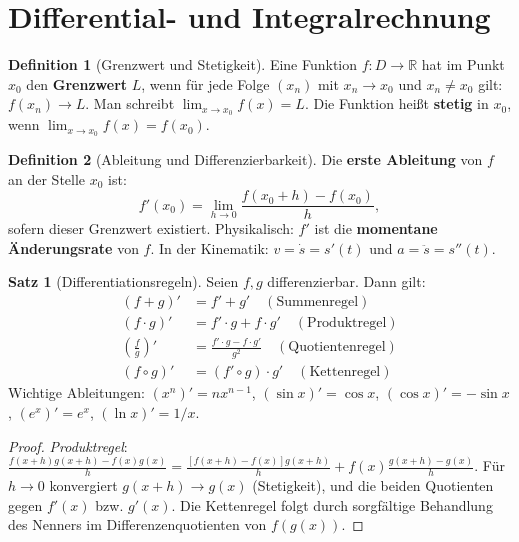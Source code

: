 ﻿\documentclass[a4paper,12pt]{report}
\theoremstyle{definition}
\newtheorem{definition}{Definition}
\newtheorem{satz}{Satz}
\begin{document}
\section{Differential- und Integralrechnung}

\begin{definition}[Grenzwert und Stetigkeit]
Eine Funktion $f: D \to \mathbb{R}$ hat im Punkt $x_0$ den \textbf{Grenzwert} $L$,
wenn f\"ur jede Folge $(x_n)$ mit $x_n \to x_0$ und $x_n \neq x_0$ gilt: $f(x_n) \to L$.
Man schreibt $\lim_{x \to x_0} f(x) = L$.
Die Funktion hei\ss{}t \textbf{stetig} in $x_0$, wenn $\lim_{x\to x_0}f(x) = f(x_0)$.
\end{definition}

\begin{definition}[Ableitung und Differenzierbarkeit]
Die \textbf{erste Ableitung} von $f$ an der Stelle $x_0$ ist:
\[
  f'(x_0) = \lim_{h \to 0} \frac{f(x_0+h) - f(x_0)}{h},
\]
sofern dieser Grenzwert existiert. Physikalisch: $f'$ ist die
\textbf{momentane \"Anderungsrate} von $f$. In der Kinematik:
$v = \dot{s} = s'(t)$ und $a = \ddot{s} = s''(t)$.
\end{definition}

\begin{satz}[Differentiationsregeln]
Seien $f, g$ differenzierbar. Dann gilt:
\begin{align*}
  (f + g)' &= f' + g' \quad (\text{Summenregel}) \\
  (f \cdot g)' &= f'\cdot g + f \cdot g' \quad (\text{Produktregel}) \\
  \left(\frac{f}{g}\right)' &= \frac{f'\cdot g - f \cdot g'}{g^2} \quad (\text{Quotientenregel}) \\
  (f \circ g)' &= (f' \circ g) \cdot g' \quad (\text{Kettenregel})
\end{align*}
Wichtige Ableitungen: $(x^n)' = nx^{n-1}$, $(\sin x)' = \cos x$,
$(\cos x)' = -\sin x$, $(e^x)' = e^x$, $(\ln x)' = 1/x$.
\end{satz}
\begin{proof}
\textit{Produktregel}: $\frac{f(x+h)g(x+h)-f(x)g(x)}{h}
= \frac{[f(x+h)-f(x)]g(x+h)}{h} + f(x)\frac{g(x+h)-g(x)}{h}$.
F\"ur $h\to 0$ konvergiert $g(x+h)\to g(x)$ (Stetigkeit), und
die beiden Quotienten gegen $f'(x)$ bzw. $g'(x)$.
Die Kettenregel folgt durch sorgf\"altige Behandlung des Nenners
im Differenzenquotienten von $f(g(x))$.
\end{proof}
\end{document}
